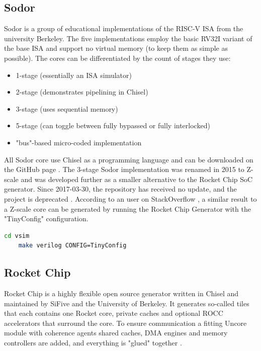 \subsection{Sodor}
Sodor is a group of educational implementations of the RISC-V
ISA from the university Berkeley. The five implementations
employ the basic RV32I variant of the base ISA and support
no virtual memory (to keep them as simple as possible).
The cores can be differentiated by the count of
stages they use:
\begin{itemize}
    \item 1-stage (essentially an ISA simulator)
    \item 2-stage (demonstrates pipelining in Chisel)
    \item 3-stage (uses sequential memory)
    \item 5-stage (can toggle between fully bypassed or fully interlocked)
    \item "bus"-based micro-coded implementation
\end{itemize}
All Sodor core use Chisel as a programming language
and can be downloaded on the GitHub page
\cite{github_risc-sodor}.
The 3-stage Sodor implementation was renamed in 2015 to Z-scale
\cite{risc-v_z-scale} and was developed further 
as a smaller alternative to the Rocket Chip SoC generator.
Since 2017-03-30, the repository has received no update,
and the project is deprecated \cite{github_z-scale}.
According to an user on StackOverflow \cite{stackoverflow_zscale},
a similar result to a Z-scale core can be generated by
running the Rocket Chip Generator with the "TinyConfig" configuration.
\begin{lstlisting}[language=bash, frame=single]
    cd vsim
    make verilog CONFIG=TinyConfig
\end{lstlisting}

\subsection{Rocket Chip}\label{rocket-chip}
Rocket Chip is a highly flexible open source generator
written in Chisel and maintained by SiFive and the University
of Berkeley. It generates so-called tiles that
each contains one Rocket core, private caches and optional
ROCC accelerators that
surround the core. To ensure communication a fitting
Uncore module with coherence agents shared caches,
DMA engines and memory controllers are added, and
everything is "glued" together
\cite{risc-v_workshop_jan2015}.

